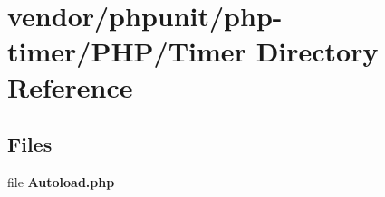 \section{vendor/phpunit/php-\/timer/\+P\+H\+P/\+Timer Directory Reference}
\label{dir_1c46d34748b6e127a7f07e07dce7f073}
\subsection*{Files}
\begin{DoxyCompactItemize}
\item 
file {\bf Autoload.\+php}
\end{DoxyCompactItemize}
